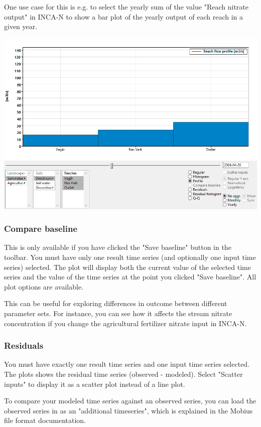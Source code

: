 \documentclass[11pt]{article}
\theoremstyle{definition}
\begin{document}
One use case for this is e.g. to select the yearly sum of the value "Reach nitrate output" in INCA-N to show a bar plot of the yearly output of each reach in a given year.

\begin{center}
\includegraphics[width=0.7\linewidth]{img/scr2}
\end{center}

\subsubsection{Compare baseline}\label{sec:comparebaseline}

This is only available if you have clicked the "Save baseline" button in the toolbar. You must have only one result time series (and optionally one input time series) selected. The plot will display both the current value of the selected time series and the value of the time series at the point you clicked "Save baseline". All plot options are available.

This can be useful for exploring differences in outcome between different parameter sets. For instance, you can see how it affects the stream nitrate concentration if you change the agricultural fertilizer nitrate input in INCA-N.

\subsubsection{Residuals}

You must have exactly one result time series and one input time series selected. The plots shows the residual time series (observed - modeled). Select "Scatter inputs" to display it as a scatter plot instead of a line plot.

To compare your modeled time series against an observed series, you can load the observed series in as an "additional timeseries", which is explained in the Mobius file format documentation.
\end{document}
